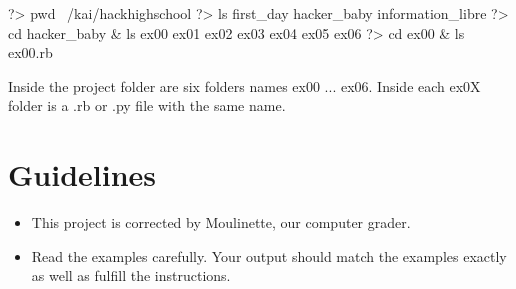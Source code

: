 \documentclass{42-en}
\begin{document}
\begin{42console}
	?> pwd
	~/kai/hackhighschool
	?> ls
	first_day
	hacker_baby
	information_libre
	?> cd hacker_baby & ls
	ex00
	ex01
	ex02
	ex03
	ex04
	ex05
	ex06
	?> cd ex00 & ls
	ex00.rb
\end{42console}

Inside the project folder are six folders names ex00 ... ex06. Inside each ex0X folder is a .rb or .py file with the same name.


\chapter{Guidelines}

\begin{itemize}

  \item This project is corrected by Moulinette, our computer grader.
 
  \item Read the examples carefully. Your output should match the examples exactly as well as fulfill the instructions.



\end{itemize}

\newpage


\startexercices


\end{document}
